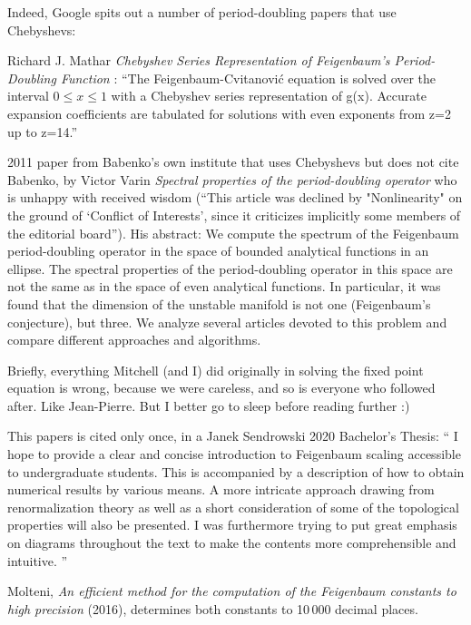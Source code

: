 \begin{description}
Indeed, Google spits out a number of period-doubling papers that use
Chebyshevs:

Richard J. Mathar
{\em Chebyshev Series Representation of Feigenbaum's
Period-Doubling Function} :
``The Feigenbaum-Cvitanovi\'c equation is solved over the interval
$0\leq{x}\leq1$ with a Chebyshev series representation of g(x). Accurate
expansion coefficients are tabulated for solutions with even exponents
from z=2 up to z=14.''

2011 paper from Babenko's own institute that uses
Chebyshevs but does not cite Babenko, by
Victor Varin {\em Spectral properties of the period-doubling operator}
 who is unhappy with received wisdom (``This article was
declined by "Nonlinearity" on the ground of `Conflict of Interests',
since it criticizes implicitly some members of the editorial board'').
His abstract: We compute the spectrum of the Feigenbaum period-doubling
operator in the space of bounded analytical functions in an ellipse. The
spectral properties of the period-doubling operator in this space are not
the same as in the space of even analytical functions. In particular, it
was found that the dimension of the unstable manifold is not one
(Feigenbaum's conjecture), but three. We analyze several articles devoted
to this problem and compare different approaches and algorithms.

Briefly, everything Mitchell (and I) did originally in solving the fixed
point equation is wrong, because we were careless, and so is everyone who
followed after. Like Jean-Pierre. But I better go to sleep before reading
further :)

This papers is cited only once, in a Janek  Sendrowski 2020
{Bachelor's Thesis}: ``
I hope to provide a clear and concise introduction to Feigenbaum scaling
accessible to undergraduate students.   This  is  accompanied  by  a
description  of  how  to obtain numerical results by various means.  A
more intricate approach drawing from renormalization theory as well as
a short consideration of some of the topological properties will also be
presented.  I was furthermore trying to put great emphasis on diagrams
throughout the text to make the contents more comprehensible and
intuitive.
''

Molteni, {\em An efficient method for the computation of
the {Feigenbaum} constants to high precision} (2016),
determines both constants to 10\,000 decimal places.



\end{description}
